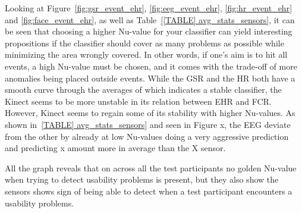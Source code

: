 Looking at Figure~\ref{fig:gsr_event_ehr}, \ref{fig:eeg_event_ehr}, \ref{fig:hr_event_ehr} and \ref{fig:face_event_ehr},
as well as Table~\ref{[TABLE] avg_stats_sensors}, it can be seen that choosing a higher Nu-value for your classifier can yield interesting propositions if the classifier should cover as many problems as possible while minimizing the area wrongly covered.
In other words, if one's aim is to hit all events, a high Nu-value must be chosen, and it comes with the trade-off of
more anomalies being placed outside events. 
While the GSR and the HR both have a smooth curve through the averages of which indicates a stable classifier, the Kinect seems to be more unstable in its relation between EHR and FCR. However, Kinect seems to regain some of its stability with higher Nu-values. As shown in~\ref{TABLE] avg_stats_sensors} and seen in Figure x, the EEG deviate from the other by already at low Nu-values doing a very aggressive prediction and predicting x amount more in average than the X sensor.

All the graph reveals that on across all the test participants no golden Nu-value when trying to detect usability problems is present, but they also show the sensors shows sign of being able to detect when a test participant encounters a usability problems.
